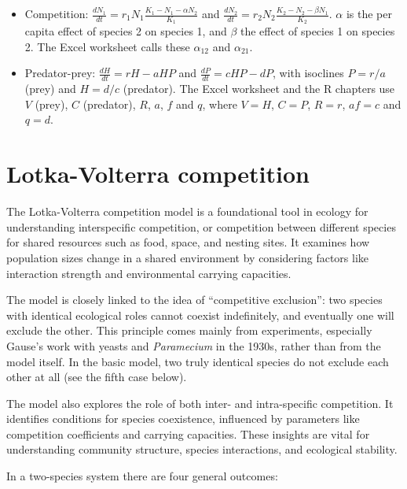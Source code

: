 \documentclass[
  a4paper]{book}
\providecommand{\tightlist}{%
  \setlength{\itemsep}{0pt}\setlength{\parskip}{0pt}}
\begin{document}
\begin{itemize}
\tightlist
\item
  Competition: \(\frac{dN_1}{dt} = r_1 N_1 \frac{K_1 - N_1 - \alpha N_2}{K_1}\) and \(\frac{dN_2}{dt} = r_2 N_2 \frac{K_2 - N_2 - \beta N_1}{K_2}\). \(\alpha\) is the per capita effect of species 2 on species 1, and \(\beta\) the effect of species 1 on species 2. The Excel worksheet calls these \(\alpha_{12}\) and \(\alpha_{21}\).
\item
  Predator-prey: \(\frac{dH}{dt} = rH - aHP\) and \(\frac{dP}{dt} = cHP - dP\), with isoclines \(P = r/a\) (prey) and \(H = d/c\) (predator). The Excel worksheet and the R chapters use \(V\) (prey), \(C\) (predator), \(R\), \(a\), \(f\) and \(q\), where \(V = H\), \(C = P\), \(R = r\), \(af = c\) and \(q = d\).
\end{itemize}

\chapter{Lotka-Volterra competition}\label{lotka-volterra-competition}

The Lotka-Volterra competition model is a foundational tool in ecology for understanding interspecific competition, or competition between different species for shared resources such as food, space, and nesting sites. It examines how population sizes change in a shared environment by considering factors like interaction strength and environmental carrying capacities.

The model is closely linked to the idea of ``competitive exclusion'': two species with identical ecological roles cannot coexist indefinitely, and eventually one will exclude the other. This principle comes mainly from experiments, especially Gause's work with yeasts and \emph{Paramecium} in the 1930s, rather than from the model itself. In the basic model, two truly identical species do not exclude each other at all (see the fifth case below).

The model also explores the role of both inter- and intra-specific competition. It identifies conditions for species coexistence, influenced by parameters like competition coefficients and carrying capacities. These insights are vital for understanding community structure, species interactions, and ecological stability.

In a two-species system there are four general outcomes:
\end{document}
